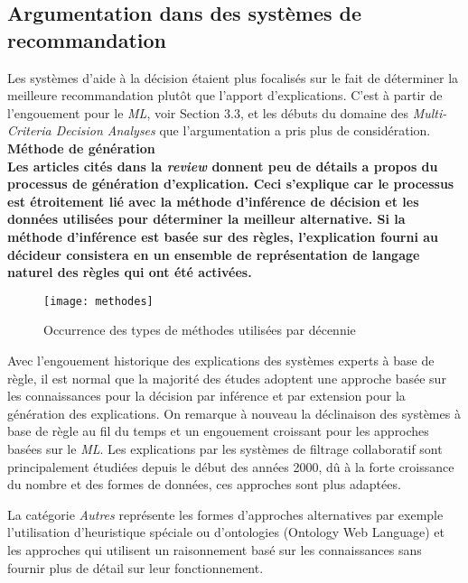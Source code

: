 \documentclass[a4paper, 11pt]{article}
\renewcommand{\textbf}[1]{\begingroup\bfseries\mathversion{bold}#1\endgroup}
\begin{document}
\subsection{Argumentation dans des systèmes de recommandation}

Les systèmes d'aide à la décision étaient plus focalisés sur le fait de déterminer la meilleure recommandation plutôt que l’apport d’explications. C'est à partir de l'engouement pour le \textit{ML}, voir Section 3.3, et les débuts du domaine des \textit{Multi-Criteria Decision Analyses} que l'argumentation a pris plus de considération.\\

\noindent \textbf{Méthode de génération}\\

Les articles cités dans la \textit{review} donnent peu de détails a propos du processus de génération d'explication. Ceci s’explique car le processus est étroitement lié avec la méthode d’inférence de décision et les données utilisées pour déterminer la meilleur alternative. Si la méthode d’inférence est basée sur des règles, l’explication fourni au décideur consistera en un ensemble de représentation de langage naturel des règles qui ont été activées.

\begin{figure}[!ht]
\begin{center}
	\texttt{[image: methodes]}
	\caption{Occurrence des types de méthodes utilisées par décennie}
\end{center}
\end{figure}


Avec l’engouement historique des explications des systèmes experts à base de règle, il est normal que la majorité des études adoptent une approche basée sur les connaissances pour la décision par inférence et par extension pour la génération des explications.
On remarque à nouveau la déclinaison des systèmes à base de règle au fil du temps et un engouement croissant pour les approches basées sur le \textit{ML}. Les explications par les systèmes de filtrage collaboratif sont principalement étudiées depuis le début des années 2000, dû à la forte croissance du nombre et des formes de données, ces approches sont plus adaptées.

La catégorie \textit{Autres} représente les formes d'approches alternatives par exemple  l'utilisation d'heuristique spéciale ou d'ontologies (Ontology Web Language) et les approches qui utilisent un raisonnement basé sur les connaissances sans fournir plus de détail sur leur fonctionnement.\\
\end{document}
